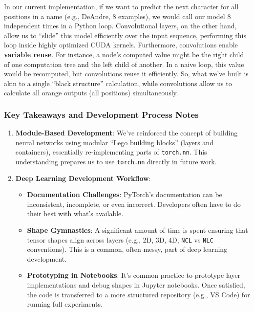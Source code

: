 In our current implementation, if we want to predict the next character for all positions in a name (e.g., DeAndre, 8 examples), we would call our model 8 independent times in a Python loop. Convolutional layers, on the other hand, allow us to ``slide'' this model efficiently over the input sequence, performing this loop inside highly optimized CUDA kernels. Furthermore, convolutions enable \textbf{variable reuse}. For instance, a node's computed value might be the right child of one computation tree and the left child of another. In a naive loop, this value would be recomputed, but convolutions reuse it efficiently. So, what we've built is akin to a single ``black structure'' calculation, while convolutions allow us to calculate all orange outputs (all positions) simultaneously.

\subsubsection{Key Takeaways and Development Process Notes}
\begin{enumerate}
    \item \textbf{Module-Based Development}: We've reinforced the concept of building neural networks using modular ``Lego building blocks'' (layers and containers), essentially re-implementing parts of \texttt{torch.nn}. This understanding prepares us to use \texttt{torch.nn} directly in future work.
    \item \textbf{Deep Learning Development Workflow}:
    \begin{itemize}
        \item \textbf{Documentation Challenges}: PyTorch's documentation can be inconsistent, incomplete, or even incorrect. Developers often have to do their best with what's available.
        \item \textbf{Shape Gymnastics}: A significant amount of time is spent ensuring that tensor shapes align across layers (e.g., 2D, 3D, 4D, \texttt{NCL} vs \texttt{NLC} conventions). This is a common, often messy, part of deep learning development.
        \item \textbf{Prototyping in Notebooks}: It's common practice to prototype layer implementations and debug shapes in Jupyter notebooks. Once satisfied, the code is transferred to a more structured repository (e.g., VS Code) for running full experiments.
    \end{itemize}
\end{enumerate}

